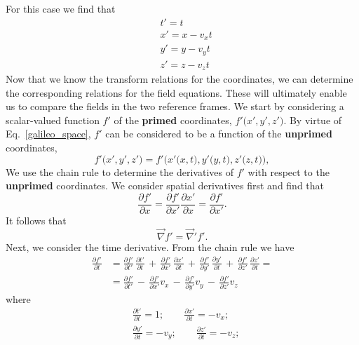 \documentclass[11pt,a4paper,oneside]{book}
\numberwithin{equation}{section}
\theoremstyle{it}
\theoremstyle{definition}
\begin{document}
For this case we find that
\begin{equation}\label{galileo_space}
	\begin{aligned}
		&t'=t \\[6pt]
		&x'=x - v_xt \\[6pt] 		
		&y'=y - v_yt \\[6pt] 		
		&z'=z - v_zt 	
	\end{aligned}
\end{equation} 
Now that we know the transform relations for the coordinates, we can determine 
the corresponding relations for the field equations. These will ultimately 
enable us to compare the fields in the two reference frames. We start by 
considering a scalar-valued function $f'$ of the \textbf{primed} coordinates, 
$f'\big(x',y',z'\big)$. By virtue of Eq.~\ref{galileo_space}, $f'$ can be 
considered to be a function of the \textbf{unprimed} coordinates, 
$$f'\big(x',y',z'\big)=f'\big(x'\big(x,t\big),y'\big(y,t\big),z'\big(z,t\big)\big),$$
We use the chain rule to determine the derivatives of $f'$ with respect to the 
\textbf{unprimed} coordinates. We consider spatial derivatives first and find 
that $$ \frac{\partial f'}{\partial x} =  \frac{\partial f'}{\partial x'} 
\frac{\partial x'}{\partial x} = \frac{\partial f'}{\partial x'}.$$
It follows that $$ \vec{\nabla}f'=\vec{\nabla}'f'.$$
Next, we consider the time derivative. From the chain rule we have 
\begin{equation}\label{woodson_1}
	\begin{aligned}
		\frac{\partial f'}{\partial t} &= \frac{\partial f'}{\partial 
		t'}\,\frac{\partial t'}{\partial t}\,+\,\frac{\partial f'}{\partial 
		x'}\,\frac{\partial x'}{\partial t}\,+\,\frac{\partial f'}{\partial 
		y'}\,\frac{\partial y'}{\partial t}\,+\,\frac{\partial f'}{\partial 
		z'}\,\frac{\partial z'}{\partial t} = \\[8pt]
		& = \frac{\partial f'}{\partial t'}\,-\,\frac{\partial f'}{\partial x'} 
		v_x\,-\,\frac{\partial f'}{\partial y'} v_y\,-\,\frac{\partial 
		f'}{\partial z'} v_z
	\end{aligned}
\end{equation} 
where 
\begin{equation}
	\begin{aligned} 
		&\frac{\partial t'}{\partial t} = 1; \qquad \frac{\partial x'}{\partial 
		t} = -v_x;\\[8pt]
		&\frac{\partial y'}{\partial t} = -v_y; \qquad \frac{\partial 
		z'}{\partial t} = -v_z;\\[8pt]
	\end{aligned}
\end{equation} 
\end{document}
